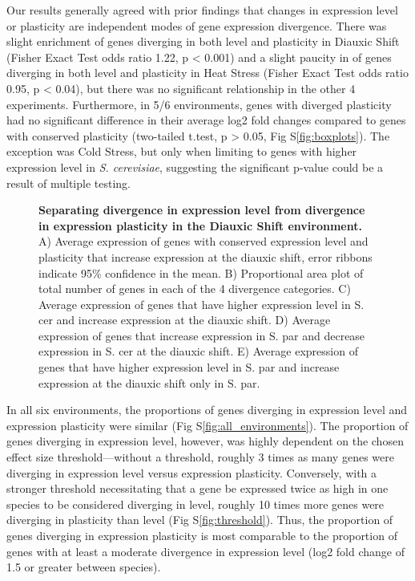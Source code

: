 Our results generally agreed with prior findings that changes in expression level or plasticity are independent modes of gene expression divergence. There was slight enrichment of genes diverging in both level and plasticity in Diauxic Shift (Fisher Exact Test odds ratio 1.22, p < 0.001) and a slight paucity in of genes diverging in both level and plasticity in Heat Stress (Fisher Exact Test odds ratio 0.95, p < 0.04), but there was no significant relationship in the other 4 experiments. Furthermore, in 5/6 environments, genes with diverged plasticity had no significant difference in their average log2 fold changes compared to genes with conserved plasticity (two-tailed t.test, p > 0.05, Fig S\ref{fig:boxplots}). The exception was Cold Stress, but only when limiting to genes with higher expression level in \textit{S. cerevisiae}, suggesting the significant p-value could be a result of multiple testing.

\begin{figure}
    \centering
    \caption{\textbf{Separating divergence in expression level from divergence in expression plasticity in the Diauxic Shift environment.} A) Average expression of genes with conserved expression level and plasticity that increase expression at the diauxic shift, error ribbons indicate 95\% confidence in the mean. B) Proportional area plot of total number of genes in each of the 4 divergence categories. C) Average expression of genes that have higher expression level in S. cer and increase expression at the diauxic shift. D) Average expression of genes that increase expression in S. par and decrease expression in S. cer at the diauxic shift. E) Average expression of genes that have higher expression level in S. par and increase expression at the diauxic shift only in S. par.}
    \label{fig:diauxic}
\end{figure}

In all six environments, the proportions of genes diverging in expression level and expression plasticity were similar (Fig S\ref{fig:all_environments}). The proportion of genes diverging in expression level, however, was highly dependent on the chosen effect size threshold—without a threshold, roughly 3 times as many genes were diverging in expression level versus expression plasticity. Conversely, with a stronger threshold necessitating that a gene be expressed twice as high in one species to be considered diverging in level, roughly 10 times more genes were diverging in plasticity than level (Fig S\ref{fig:threshold}). Thus, the proportion of genes diverging in expression plasticity is most comparable to the proportion of genes with at least a moderate divergence in expression level (log2 fold change of 1.5 or greater between species).

